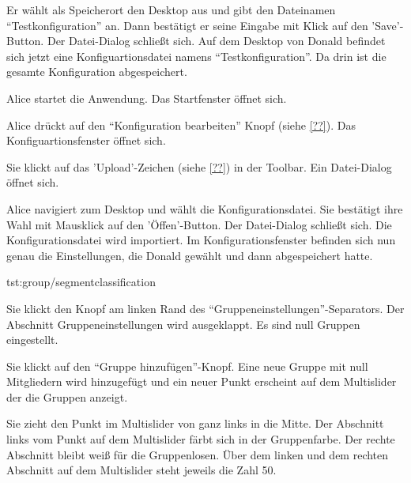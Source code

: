 \documentclass[parskip=full,11pt]{scrartcl}
\begin{document}
{Er wählt als Speicherort den Desktop aus und gibt den Dateinamen \enquote{Testkonfiguration} an. Dann bestätigt er seine Eingabe mit Klick auf den 'Save'-Button.}
{Der Datei-Dialog schließt sich. Auf dem Desktop von Donald befindet sich jetzt eine Konfiguartionsdatei namens \enquote{Testkonfiguration}. Da drin ist die gesamte Konfiguration abgespeichert.}

{Alice startet die Anwendung.}
{Das Startfenster öffnet sich.}

{Alice drückt auf den \enquote{Konfiguration bearbeiten} Knopf (siehe \cref{??}).}
{Das Konfiguartionsfenster öffnet sich.}

{Sie klickt auf das 'Upload'-Zeichen (siehe \cref{??}) in der Toolbar.}
{Ein Datei-Dialog öffnet sich.}

{Alice navigiert zum Desktop und wählt die Konfigurationsdatei. Sie bestätigt ihre Wahl mit Mausklick auf den 'Öffen'-Button.}
{Der Datei-Dialog schließt sich. Die Konfigurationsdatei wird importiert. Im Konfigurationsfenster befinden sich nun genau die Einstellungen, die Donald gewählt und dann abgespeichert hatte.}

{tst:group/segmentclassification}

{Sie klickt den Knopf am linken Rand des \enquote{Gruppeneinstellungen}-Separators.}
{Der Abschnitt Gruppeneinstellungen wird ausgeklappt. Es sind null Gruppen eingestellt.}

{Sie klickt auf den \enquote{Gruppe hinzufügen}-Knopf.}
{Eine neue Gruppe mit null Mitgliedern wird hinzugefügt und ein neuer Punkt erscheint auf dem Multislider der die Gruppen anzeigt.}

{Sie zieht den Punkt im Multislider von ganz links in die Mitte.}
{Der Abschnitt links vom Punkt auf dem Multislider färbt sich in der Gruppenfarbe. Der rechte Abschnitt bleibt weiß für die Gruppenlosen. Über dem linken und dem rechten Abschnitt auf dem Multislider steht jeweils die Zahl 50.}
\end{document}
